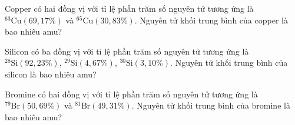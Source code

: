 \begin{bt}
	Copper có hai đồng vị với tỉ lệ phần trăm số nguyên tử tương ứng là ${}^{63}\mathrm{Cu}(69{,}17\%)$ và ${}^{65}\mathrm{Cu}(30{,}83\%)$. Nguyên tử khối trung bình của copper là bao nhiêu amu?
\end{bt}

\begin{bt}
	Silicon có ba đồng vị với tỉ lệ phần trăm số nguyên tử tương ứng là ${}^{28}\mathrm{Si}(92{,}23\%)$, ${}^{29}\mathrm{Si}(4{,}67\%)$, ${}^{30}\mathrm{Si}(3{,}10\%)$. Nguyên tử khối trung bình của silicon là bao nhiêu amu?
\end{bt}

\begin{bt}
	Bromine có hai đồng vị với tỉ lệ phần trăm số nguyên tử tương ứng là ${}^{79}\mathrm{Br}(50{,}69\%)$ và ${}^{81}\mathrm{Br}(49{,}31\%)$. Nguyên tử khối trung bình của bromine là bao nhiêu amu?
\end{bt}

